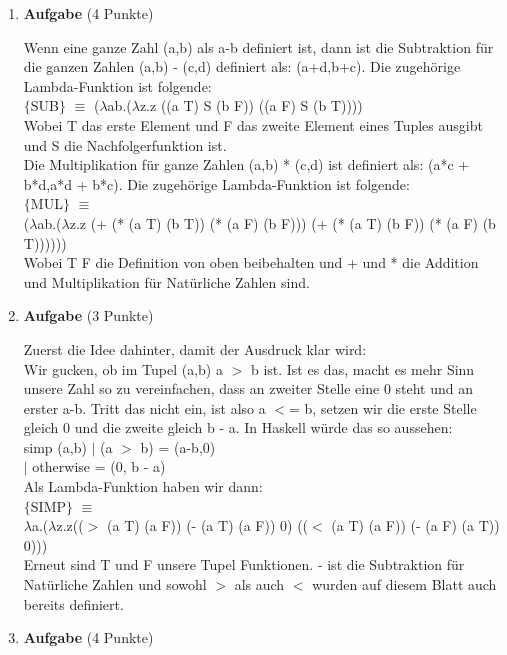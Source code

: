 \documentclass[11pt]{article}
\newcommand{\punkte}[1]{{\small{ }(#1 Punkte)}}
\newcommand{\aufgabe}[1]{\item{\bf #1}}
\begin{document}
\begin{enumerate}
\aufgabe{Aufgabe}\punkte{4}

Wenn eine ganze Zahl (a,b) als a-b definiert ist, dann ist die Subtraktion für die ganzen Zahlen (a,b) - (c,d) definiert als: (a+d,b+c). Die zugehörige Lambda-Funktion ist folgende:\\
$\lbrace$SUB$\rbrace$ $\equiv$ ($\lambda$ab.($\lambda$z.z ((a T) S (b F)) ((a F) S (b T))))\\
Wobei T das erste Element und F das zweite Element eines Tuples ausgibt und S die Nachfolgerfunktion ist.\\
Die Multiplikation für ganze Zahlen (a,b) * (c,d) ist definiert als: (a*c + b*d,a*d + b*c). Die zugehörige Lambda-Funktion ist folgende:\\
$\lbrace$MUL$\rbrace$ $\equiv$\\ ($\lambda$ab.($\lambda$z.z (+ (* (a T) (b T)) (* (a F) (b F))) (+ (* (a T) (b F)) (* (a F) (b T))))))\\
Wobei T F die Definition von oben beibehalten und + und * die Addition und Multiplikation für Natürliche Zahlen sind.

\aufgabe{Aufgabe}\punkte{3}

Zuerst die Idee dahinter, damit der Ausdruck klar wird:\\
Wir gucken, ob im Tupel (a,b) a $>$ b ist. Ist es das, macht es mehr Sinn unsere Zahl so zu vereinfachen, dass an zweiter Stelle eine 0 steht und an erster a-b. Tritt das nicht ein, ist also a $<$= b, setzen wir die erste Stelle gleich 0 und die zweite gleich b - a. In Haskell würde das so aussehen:\\
simp (a,b) $|$ (a $>$ b) = (a-b,0)\\
\phantom{simp (a,b) }$|$ otherwise = (0, b - a)\\
Als Lambda-Funktion haben wir dann:\\
$\lbrace$SIMP$\rbrace$ $\equiv$\\ $\lambda$a.($\lambda$z.z(($>$ (a T) (a F)) (- (a T) (a F)) 0) (($<$ (a T) (a F)) (- (a F) (a T)) 0)))\\
Erneut sind T und F unsere Tupel Funktionen. - ist die Subtraktion für Natürliche Zahlen und sowohl $>$ als auch $<$ wurden auf diesem Blatt auch bereits definiert.

\aufgabe{Aufgabe}\punkte{4}


\end{enumerate}
\end{document}
